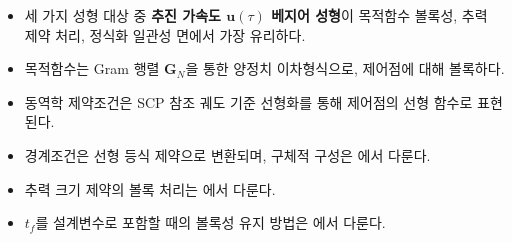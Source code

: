 \documentclass[11pt]{article}
\begin{document}
\begin{itemize}
  \item 세 가지 성형 대상 중 \textbf{추진 가속도 $\mathbf{u}(\tau)$ 베지어 성형}이 목적함수 볼록성,
        추력 제약 처리, 정식화 일관성 면에서 가장 유리하다.
  \item 목적함수는 Gram 행렬 $\mathbf{G}_N$을 통한 양정치 이차형식으로, 제어점에 대해 볼록하다.
  \item 동역학 제약조건은 SCP 참조 궤도 기준 선형화를 통해 제어점의 선형 함수로 표현된다.
  \item 경계조건은 선형 등식 제약으로 변환되며, 구체적 구성은 \cite{report004}에서 다룬다.
  \item 추력 크기 제약의 볼록 처리는 \cite{report005}에서 다룬다.
  \item $t_f$를 설계변수로 포함할 때의 볼록성 유지 방법은 \cite{report007}에서 다룬다.
\end{itemize}



\end{document}
